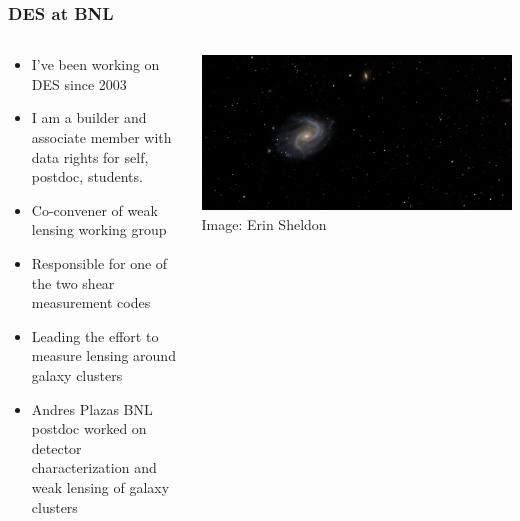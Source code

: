 \documentclass{beamer}
\begin{document}
\frame
{

    \frametitle{DES at BNL}

 
    \begin{columns}
        \begin{column}{0.5\textwidth}    
            \begin{itemize}

                \item I've been working on DES since 2003

                \item I am a {\color{gold} builder} and {\color{gold} associate
                    member} with data rights for self, postdoc, students.

                \item Co-convener of weak lensing working group

                \item Responsible for one of the two shear measurement codes

                \item Leading the effort to measure lensing around galaxy clusters

                \item Andres Plazas BNL postdoc worked on detector
                    characterization and weak lensing of galaxy clusters

            \end{itemize}
        \end{column}
        \begin{column}{0.5\textwidth}
                \centering
                \includegraphics[angle=90,origin=c,height=0.6\textheight,trim=0 0 200 0,clip]{ngc0894-rebin4.jpg}
                \newline
                {\tiny Image: Erin Sheldon}
        \end{column}
    \end{columns}

}
\end{document}

